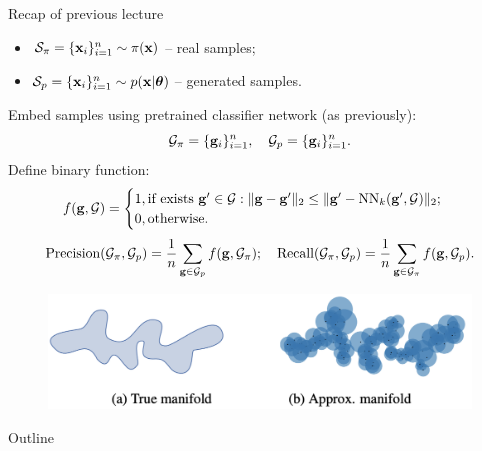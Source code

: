 \begin{frame}{Recap of previous lecture}
		\begin{itemize}
			\item $\mathcal{S}_{\pi} = \{\mathbf{x}_i\}_{i=1}^{n} \sim \pi(\mathbf{x})$ -- real samples;
			\item $\mathcal{S}_{p} = \{\mathbf{x}_i\}_{i=1}^{n} \sim p(\mathbf{x} | \boldsymbol{\theta})$ -- generated samples.
		\end{itemize}
		Embed samples using pretrained classifier network (as previously):
		\[
			\mathcal{G}_{\pi} = \{\mathbf{g}_i\}_{i=1}^n, \quad \mathcal{G}_{p} = \{\mathbf{g}_i\}_{i=1}^n.
		\]
		Define binary function:
		\[
			f(\mathbf{g}, \mathcal{G}) = 
			\begin{cases}
				1, \text{if exists } \mathbf{g}' \in \mathcal{G}: \| \mathbf{g}  - \mathbf{g}'\|_2 \leq \| \mathbf{g}' - \text{NN}_k(\mathbf{g}', \mathcal{G})\|_2; \\
				0, \text{otherwise.}
			\end{cases}
		\]
		\[
			\text{Precision} (\mathcal{G}_{\pi}, \mathcal{G}_{p}) = \frac{1}{n} \sum_{\mathbf{g} \in \mathcal{G}_{p}} f(\mathbf{g}, \mathcal{G}_{\pi}); \quad \text{Recall} (\mathcal{G}_{\pi}, \mathcal{G}_{p}) = \frac{1}{n} \sum_{\mathbf{g} \in \mathcal{G}_{\pi}} f(\mathbf{g}, \mathcal{G}_{p}).
		\]
		\vspace{-0.4cm}
		\begin{figure}
			\includegraphics[width=0.7\linewidth]{figs/pr_k_nearest}
		\end{figure}
\end{frame}
\begin{frame}{Outline}
	\tableofcontents
\end{frame}
